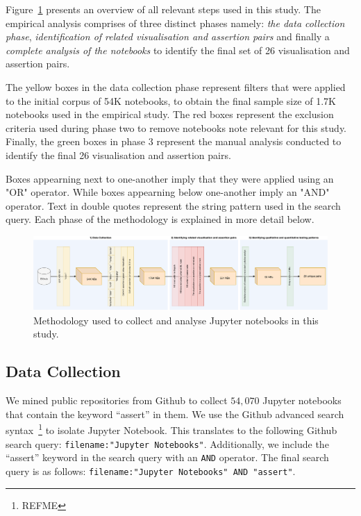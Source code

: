 \documentclass[conference]{IEEEtran}
\begin{document}
Figure~\ref{fig:method} presents an overview of all relevant steps used in this study. The empirical analysis comprises of three distinct phases namely: \textit{the data collection phase}, \textit{identification of related visualisation and assertion pairs} and finally a \textit{complete analysis of the notebooks} to identify the final set of 26 visualisation and assertion pairs.

The yellow boxes in the data collection phase represent filters that were applied to the initial corpus of 54K notebooks, to obtain the final sample size of 1.7K notebooks used in the empirical study. The red boxes represent the exclusion criteria used during phase two to remove notebooks note relevant for this study. Finally, the green boxes in phase 3 represent the manual analysis conducted to identify the final 26 visualisation and assertion pairs.

Boxes appearning next to one-another imply that they were applied using an "OR" operator. While boxes appearning below one-another imply an "AND" operator. Text in double quotes represent the string pattern used in the search query. Each phase of the methodology is explained in more detail below.

\begin{figure}
  \centering
  \includegraphics[width=\textwidth]{method.pdf}
  \caption{Methodology used to collect and analyse Jupyter notebooks
    in this study.}
  \label{fig:method}
\end{figure}

\subsection{Data Collection}\label{sec:data-collect}

We mined public repositories from Github to collect $54,070$ Jupyter notebooks that contain the keyword ``assert'' in them. We use the Github advanced search syntax~\footnote{REFME} to isolate Jupyter Notebook. This translates to the following Github search query: \texttt{filename:"Jupyter Notebooks"}. Additionally, we include the ``assert'' keyword in the search query with an \texttt{AND} operator. The final search query is as follows: \texttt{filename:"Jupyter Notebooks" AND "assert"}.
\end{document}
